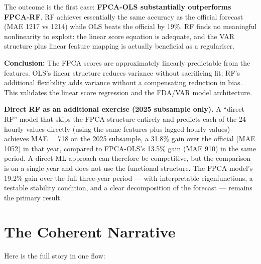 \documentclass[11pt,a4paper]{article}
\begin{document}
The outcome is the first case: \textbf{FPCA-OLS substantially outperforms FPCA-RF}.
RF achieves essentially the same accuracy as the official forecast (MAE 1217 vs 1214)
while OLS beats the official by 19\%. RF finds no meaningful nonlinearity to exploit:
the linear score equation is adequate, and the VAR structure plus linear feature
mapping is actually beneficial as a regulariser.

\begin{resultbox}
\textbf{Conclusion:} The FPCA scores are approximately linearly predictable from the
features. OLS's linear structure reduces variance without sacrificing fit; RF's
additional flexibility adds variance without a compensating reduction in bias.
This validates the linear score regression and the FDA/VAR model architecture.
\end{resultbox}

\textbf{Direct RF as an additional exercise (2025 subsample only).}
A ``direct RF'' model that skips the FPCA structure entirely and predicts each of the
24 hourly values directly (using the same features plus lagged hourly values) achieves
MAE = 718 on the 2025 subsample, a 31.8\% gain over the official (MAE 1052) in that
year, compared to FPCA-OLS's 13.5\% gain (MAE 910) in the same period.
A direct ML approach can therefore be competitive, but the comparison is on a single
year and does not use the functional structure. The FPCA model's 19.2\% gain over the
full three-year period --- with interpretable eigenfunctions, a testable stability
condition, and a clear decomposition of the forecast --- remains the primary result.

\section{The Coherent Narrative}

Here is the full story in one flow:
\end{document}
